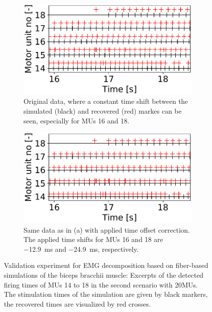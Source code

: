 \begin{figure}
  \centering%
  \begin{subfigure}[t]{0.47\textwidth}%
    \centering%
    \includegraphics[width=\textwidth]{images/results/application/emg_20mus-40s_new-noshift2.pdf}%
    \caption{Original data, where a constant time shift between the simulated (black) and recovered (red) markes can be seen, especially for MUs 16 and 18.}%
    \label{fig:newmus_nocorrection}%
  \end{subfigure}
  \hfill
  \begin{subfigure}[t]{0.47\textwidth}%
    \centering%
    \includegraphics[width=\textwidth]{images/results/application/emg_20mus-40s_new-shift2.pdf}%
    \caption{Same data as in (a) with applied time offset correction. The applied time shifts for MUs 16 and 18 are \SI{-12.9}{\ms} and \SI{-24.9}{\ms}, respectively.}%
    \label{fig:newmus_withcorrection}%
  \end{subfigure}
  \caption{Validation experiment for EMG decomposition based on fiber-based simulations of the biceps bracchii muscle: Excerpts of the detected firing times of MUs 14 to 18 in the second scenario with 20MUs. The stimulation times of the simulation are given by black markers, the recovered times are visualized by red crosses.}%
  \label{fig:newmus_shifting}%
\end{figure}

